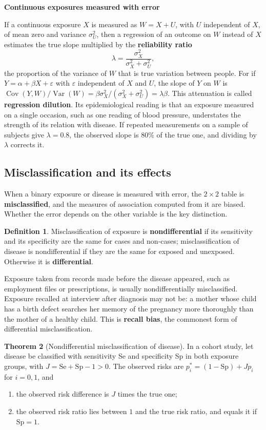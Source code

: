 \documentclass[11pt,a4paper]{article}
\numberwithin{equation}{section}
\DeclareMathOperator{\Var}{Var}
\DeclareMathOperator{\Cov}{Cov}
\theoremstyle{definition}
\newtheorem{thm}{Theorem}[subsection]
\newtheorem{defn}[thm]{Definition}
\newcommand{\subhead}[1]{%
  \par\medskip\noindent\textbf{#1}\par\nobreak\smallskip}
\begin{document}
\subhead{Continuous exposures measured with error}

If a continuous exposure $X$ is measured as $W = X + U$, with $U$ independent of $X$, of mean zero and variance $\sigma^2_U$, then a regression of
an outcome on $W$ instead of $X$ estimates the true slope multiplied by the \textbf{reliability ratio}
\[
\lambda = \frac{\sigma^2_X}{\sigma^2_X + \sigma^2_U} ,
\]
the proportion of the variance of $W$ that is true variation between people. For if $Y = \alpha + \beta X + \varepsilon$ with $\varepsilon$ independent of
$X$ and $U$, the slope of $Y$ on $W$ is $\Cov(Y, W)/\Var(W) = \beta\sigma^2_X/(\sigma^2_X + \sigma^2_U) = \lambda\beta$. This attenuation is called
\textbf{regression dilution}. Its epidemiological reading is that an exposure measured on a single occasion, such as one
reading of blood pressure, understates the strength of its relation with disease. If repeated measurements on a sample of subjects give
$\lambda = 0.8$, the observed slope is $80\%$ of the true one, and dividing by $\lambda$ corrects it.

\subsection{Misclassification and its effects}
\label{sec:misclass}

When a binary exposure or disease is measured with error, the $2 \times 2$ table is \textbf{misclassified}, and the measures of association
computed from it are biased. Whether the error depends on the other variable is the key distinction.

\begin{defn}
Misclassification of exposure is \textbf{nondifferential} if its sensitivity and its specificity are the same for cases and
non-cases;
misclassification of disease is nondifferential if they are the same for exposed and unexposed. Otherwise it is \textbf{differential}.
\end{defn}

Exposure taken from records made before the disease appeared, such as employment files or prescriptions, is usually
nondifferentially misclassified. Exposure recalled at interview after diagnosis may not be: a mother whose child has a birth defect searches her memory of
the pregnancy more thoroughly than the mother of a healthy child. This is \textbf{recall bias}, the commonest form of differential
misclassification.

\begin{thm}[Nondifferential misclassification of disease]
\label{thm:ndd}
In a cohort study, let disease be classified with sensitivity Se and specificity Sp in both exposure groups, with $J = \text{Se} + \text{Sp} - 1 > 0$. The
observed risks are $p_i^* = (1 - \text{Sp}) + J p_i$ for $i = 0, 1$, and
\begin{enumerate}
\item the observed risk difference is $J$ times the true one;
\item the observed risk ratio lies between $1$ and the true risk ratio, and equals it if $\text{Sp} = 1$.
\end{enumerate}
\end{thm}
\end{document}

